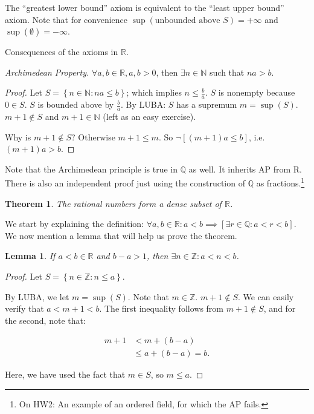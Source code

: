 \documentclass[12pt]{article}
\newtheorem*{theorem}{Theorem}
\newtheorem*{lemma}{Lemma}
\newcommand{\RR}{\mathbb{R}}
\newcommand{\QQ}{\mathbb{Q}}
\newcommand{\NN}{\mathbb{N}}
\def\ZZ{\mathbb{Z}}
\begin{document}
  The ``greatest lower bound'' axiom is equivalent to the ``least upper bound'' axiom.  Note that for convenience $\sup (\text{unbounded above } S) = + \infty$ and $\sup(\emptyset) = - \infty$.

  Consequences of the axioms in $\RR$.

     {\it Archimedean Property.} $\forall a, b \in \RR, a, b > 0$, then $\exists n \in \NN$ such that $na > b$.

     \begin{proof}
       Let $S = \left\{ n \in \NN : na \leq b \right\}$; which implies $n \leq \frac{b}{a}$.  $S$ is nonempty because $0 \in S$.  $S$ is bounded above by $\frac{b}{a}$.  By LUBA: $S$ has a supremum $m = \sup(S)$.  $m + 1 \not \in S$ and $m+1 \in \NN$ (left as an easy exercise).  
       
       Why is $m+1 \not \in S$?  Otherwise $m+1 \leq m$.  So $\neg [(m+1)a \leq b]$, i.e. $(m+1) a > b$.
     \end{proof}

     Note that the Archimedean principle is true in $\QQ$ as well.  It inherits AP from R.  There is also an independent proof just using the construction of $\QQ$ as fractions.\footnote{On HW2: An example of an ordered field, for which the AP fails.}

     \begin{theorem}
       The rational numbers form a dense subset of $\RR$.
     \end{theorem}

     We start by explaining the definition: $\forall a, b \in \RR: a < b \implies [ \exists r \in \QQ: a < r < b]$.  We now mention a lemma that will help us prove the theorem. 

     \begin{lemma}
       If $a < b \in \RR$ and $b - a > 1$, then $\exists n \in \ZZ: a < n < b$.
     \end{lemma}

     \begin{proof}
       Let $S = \left\{ n \in \ZZ : n \leq a \right\}$.

     By LUBA, we let $m = \sup(S)$.  Note that $m \in \ZZ$.  $m+1 \not \in S$.  We can easily verify that $a < m+1 < b$.  The first inequality follows from $m+1 \not \in S$, and for the second, note that:

     \begin{align*}
       m+1 &< m+(b-a) \\
       & \leq a + (b-a) = b.
     \end{align*}


    Here, we have used the fact that $m \in S$, so $m \leq a$.
     \end{proof}
\end{document}
